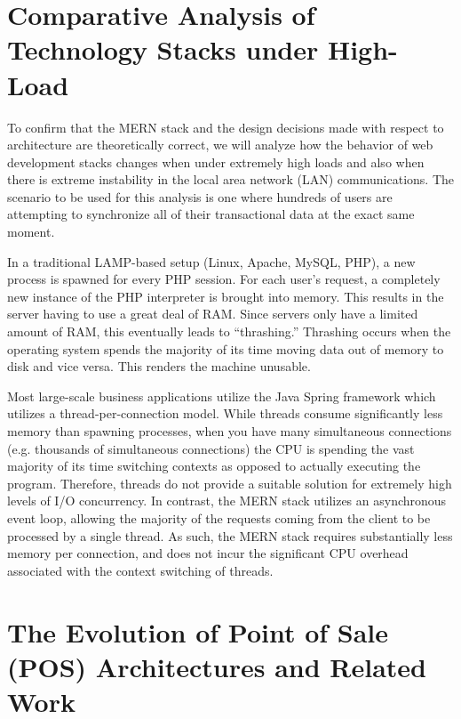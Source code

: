 \section{Comparative Analysis of Technology Stacks under High-Load}

To confirm that the MERN stack and the design decisions made with respect to architecture are theoretically correct, we will analyze how the behavior of web development stacks changes when under extremely high loads and also when there is extreme instability in the local area network (LAN) communications. The scenario to be used for this analysis is one where hundreds of users are attempting to synchronize all of their transactional data at the exact same moment.

In a traditional LAMP-based setup (Linux, Apache, MySQL, PHP), a new process is spawned for every PHP session. For each user's request, a completely new instance of the PHP interpreter is brought into memory. This results in the server having to use a great deal of RAM. Since servers only have a limited amount of RAM, this eventually leads to ``thrashing.'' Thrashing occurs when the operating system spends the majority of its time moving data out of memory to disk and vice versa. This renders the machine unusable.

Most large-scale business applications utilize the Java Spring framework which utilizes a thread-per-connection model. While threads consume significantly less memory than spawning processes, when you have many simultaneous connections (e.g. thousands of simultaneous connections) the CPU is spending the vast majority of its time switching contexts as opposed to actually executing the program. Therefore, threads do not provide a suitable solution for extremely high levels of I/O concurrency. In contrast, the MERN stack utilizes an asynchronous event loop, allowing the majority of the requests coming from the client to be processed by a single thread. As such, the MERN stack requires substantially less memory per connection, and does not incur the significant CPU overhead associated with the context switching of threads.

\section{The Evolution of Point of Sale (POS) Architectures and Related Work}

